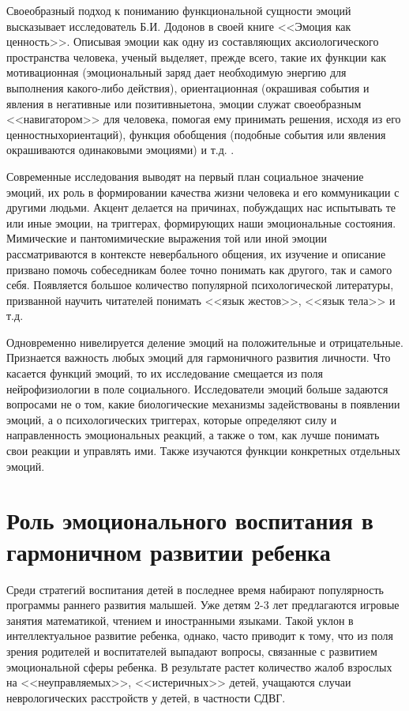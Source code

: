 \documentclass{../../common/thesisbyxetex}
\begin{document}
Своеобразный подход к пониманию функциональной сущности эмоций высказывает исследователь Б.И. 
Додонов в своей книге <<Эмоция как ценность>>. Описывая  эмоции как одну из составляющих 
аксиологического пространства человека, ученый выделяет, прежде всего, такие их функции как 
мотивационная (эмоциональный заряд дает необходимую энергию для выполнения какого-либо действия), 
ориентационная (окрашивая события и явления в негативные или позитивныетона, эмоции служат 
своеобразным <<навигатором>> для человека, помогая ему принимать решения, исходя из его 
ценностныхориентаций), функция обобщения (подобные события или явления окрашиваются одинаковыми 
эмоциями) и т.д. \cite{dode}.


Современные исследования выводят на первый план социальное значение эмоций, их роль в формировании 
качества жизни человека и его коммуникации с другими людьми. Акцент делается на причинах, 
побуждащих нас испытывать те или иные эмоции, на триггерах, формирующих наши эмоциональные 
состояния. Мимические и пантомимические выражения той или иной эмоции рассматриваются в контексте 
невербального общения, их изучение и описание призвано помочь собеседникам более точно понимать как 
другого, так и самого себя. Появляется большое количество популярной психологической литературы, 
призванной научить читателей понимать <<язык жестов>>, <<язык тела>> и т.д.

Одновременно нивелируется деление эмоций на положительные и отрицательные. Признается важность 
любых эмоций для гармоничного развития личности. Что касается функций эмоций, то их исследование 
смещается из поля нейрофизиологии в поле социального. Исследователи эмоций больше задаются 
вопросами не о том, какие биологические механизмы задействованы в появлении эмоций, а о 
психологических триггерах, которые определяют силу и направленность эмоциональных реакций, а также 
о том, как лучше понимать свои реакции и управлять ими. Также изучаются функции конкретных 
отдельных эмоций.

\section{Роль эмоционального воспитания в гармоничном развитии ребенка}

Среди стратегий воспитания детей в последнее время набирают популярность программы раннего развития 
малышей. Уже детям 2-3 лет предлагаются игровые занятия математикой, чтением и иностранными 
языками. Такой уклон в интеллектуальное развитие ребенка, однако, часто приводит к тому, что из 
поля зрения родителей и воспитателей выпадают вопросы, связанные с развитием эмоциональной сферы 
ребенка. В результате растет количество жалоб взрослых на <<неуправляемых>>, <<истеричных>> детей, 
учащаются случаи неврологических расстройств у детей, в частности СДВГ.
\end{document}

